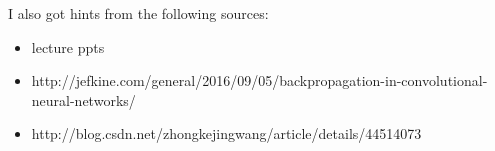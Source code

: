 \documentclass{article}
\begin{document}
I also got hints from the following sources:
\begin{itemize}
\item lecture ppts
\item http://jefkine.com/general/2016/09/05/backpropagation-in-convolutional-neural-networks/
\item http://blog.csdn.net/zhongkejingwang/article/details/44514073
\end{itemize}
\end{document}
